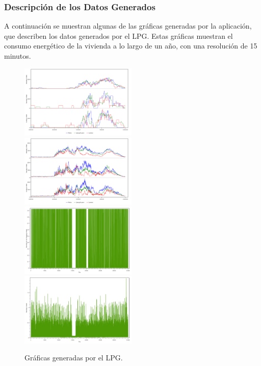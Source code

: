 \subsubsection{Descripción de los Datos Generados}
A continuación se muestran algunas de las gráficas generadas por la aplicación, que describen los datos generados
por el LPG. Estas gráficas muestran el consumo energético de la vivienda a lo largo de un año,
con una resolución de 15 minutos.
\begin{figure}[H]
    \centering
    \includegraphics[width=0.4957\textwidth]{images/LPG/WeekdayProfiles.Electricity for Car Charging.png}
    \includegraphics[width=0.4957\textwidth]{images/LPG/WeekdayProfiles.Electricity.png}
    \includegraphics[width=0.4957\textwidth]{images/LPG/SumProfiles_900s.Electricity for Car Charging.png}
    \includegraphics[width=0.4957\textwidth]{images/LPG/SumProfiles_900s.Electricity.png}
    \caption{Gráficas generadas por el LPG.}
    \label{fig:lpg_consumo}
\end{figure}

